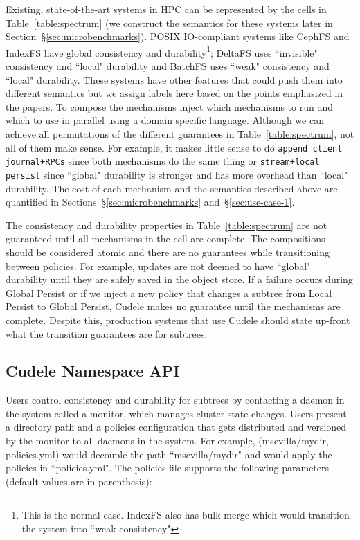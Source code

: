 Existing, state-of-the-art systems in HPC can be represented by the cells in
Table~\ref{table:spectrum} (we construct the semantics for these systems later
in Section~\S\ref{sec:microbenchmarks}).  POSIX IO-compliant systems like
CephFS and IndexFS have global consistency and durability\footnote{This is the
normal case.  IndexFS also has bulk merge which would transition the system
into ``weak consistency"}; DeltaFS uses ``invisible" consistency and ``local"
durability and BatchFS uses ``weak" consistency and ``local" durability. These
systems have other features that could push them into different semantics but
we assign labels here based on the points emphasized in the papers.  To compose
the mechanisms  inject which
mechanisms to run and which to use in parallel using a domain specific
language.  Although we can achieve all permutations of the different guarantees
in Table~\ref{table:spectrum}, not all of them make sense. For example, it
makes little sense to do \texttt{append client journal+RPCs} since both
mechanisms do the same thing or \texttt{stream+local persist} since ``global"
durability is stronger and has more overhead than ``local" durability. The cost
of each mechanism and the semantics described above are quantified in
Sections~\S\ref{sec:microbenchmarks} and~\S\ref{sec:use-case-1}.

The consistency and durability properties in Table~\ref{table:spectrum} are not
guaranteed until all mechanisms in the cell are complete. The compositions
should be considered atomic and there are no guarantees while transitioning
between policies. For example, updates are not deemed to have ``global"
durability until they are safely saved in the object store. If a failure occurs
during Global Persist or if we inject a new policy that changes a subtree from
Local Persist to Global Persist, Cudele makes no guarantee until the mechanisms
are complete. Despite this, production systems that use Cudele should state
up-front what the transition guarantees are for subtrees.

\subsection{Cudele Namespace API}
\label{sec:cudelefs-namespace-api}

Users control consistency and durability for subtrees by contacting a daemon in
the system called a monitor, which manages cluster state changes.  Users
present a directory path and a policies configuration that gets distributed and
versioned by the monitor to all daemons in the system. For example,
(msevilla/mydir, policies.yml) would decouple the path ``msevilla/mydir" and
would apply the policies in ``policies.yml".  The policies file supports the
following parameters (default values are in parenthesis):


